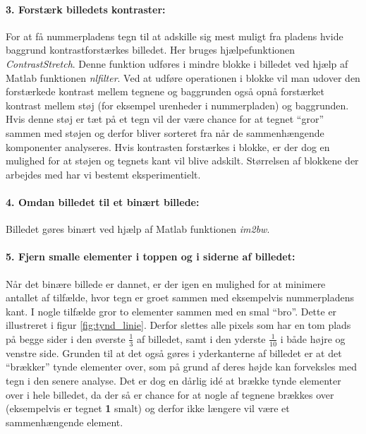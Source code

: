\paragraph{3. Forstærk billedets kontraster:}
For at få nummerpladens tegn til at adskille sig mest muligt fra pladens hvide baggrund kontrastforstærkes billedet. Her bruges hjælpefunktionen \textit{ContrastStretch}. Denne funktion udføres i mindre blokke i billedet ved hjælp af Matlab funktionen \textit{nlfilter}. Ved at udføre operationen i blokke vil man udover den forstærkede kontrast mellem tegnene og baggrunden også opnå forstærket kontrast mellem støj (for eksempel urenheder i nummerpladen) og baggrunden. Hvis denne støj er tæt på et tegn vil der være chance for at tegnet ``gror'' sammen med støjen og derfor bliver sorteret fra når de sammenhængende komponenter analyseres. Hvis kontrasten forstærkes i blokke, er der dog en mulighed for at støjen og tegnets kant vil blive adskilt. Størrelsen af blokkene der arbejdes med har vi bestemt eksperimentielt.

\paragraph{4. Omdan billedet til et binært billede:} Billedet gøres binært ved hjælp af Matlab funktionen \textit{im2bw}.

\paragraph{5. Fjern smalle elementer i toppen og i siderne af billedet:}
Når det binære billede er dannet, er der igen en mulighed for at minimere antallet af tilfælde, hvor tegn er groet sammen med eksempelvis nummerpladens kant. I nogle tilfælde gror to elementer sammen med en smal ``bro''. Dette er illustreret i figur \vref{fig:tynd_linie}. Derfor slettes alle pixels som har en tom plads på begge sider i den øverste $\frac{1}{3}$ af billedet, samt i den yderste $\frac{1}{10}$ i både højre og venstre side. Grunden til at det også gøres i yderkanterne af billedet er at det ``brækker'' tynde elementer over, som på grund af deres højde kan forveksles med tegn i den senere analyse. Det er dog en dårlig idé at brække tynde elementer over i hele billedet, da der så er chance for at nogle af tegnene brækkes over (eksempelvis er tegnet \textbf{1} smalt) og derfor ikke længere vil være et sammenhængende element.

